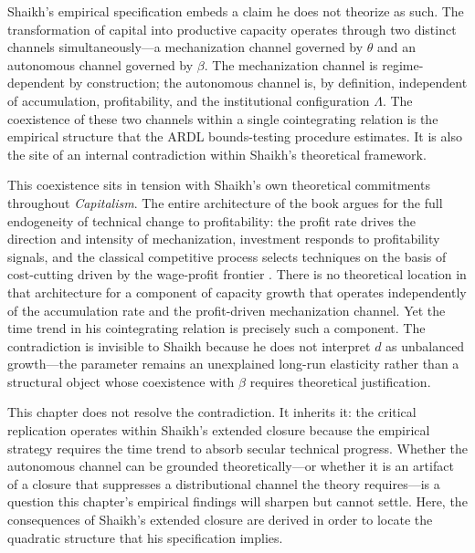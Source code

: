 Shaikh's empirical specification embeds a claim he does not theorize as such. The transformation of capital into productive capacity operates through two distinct channels simultaneously---a mechanization channel governed by $\theta$ and an autonomous channel governed by $\beta$. The mechanization channel is regime-dependent by construction; the autonomous channel is, by definition, independent of accumulation, profitability, and the institutional configuration $\Lambda$. The coexistence of these two channels within a single cointegrating relation is the empirical structure that the ARDL bounds-testing procedure estimates. It is also the site of an internal contradiction within Shaikh's theoretical framework.

This coexistence sits in tension with Shaikh's own theoretical commitments throughout \emph{Capitalism}. The entire architecture of the book argues for the full endogeneity of technical change to profitability: the profit rate drives the direction and intensity of mechanization, investment responds to profitability signals, and the classical competitive process selects techniques on the basis of cost-cutting driven by the wage-profit frontier \citep{Shaikh2016}. There is no theoretical location in that architecture for a component of capacity growth that operates independently of the accumulation rate and the profit-driven mechanization channel. Yet the time trend in his cointegrating relation is precisely such a component. The contradiction is invisible to Shaikh because he does not interpret $d$ as unbalanced growth---the parameter remains an unexplained long-run elasticity rather than a structural object whose coexistence with $\beta$ requires theoretical justification.

This chapter does not resolve the contradiction. It inherits it: the critical replication operates within Shaikh's extended closure because the empirical strategy requires the time trend to absorb secular technical progress. Whether the autonomous channel can be grounded theoretically---or whether it is an artifact of a closure that suppresses a distributional channel the theory requires---is a question this chapter's empirical findings will sharpen but cannot settle. Here, the consequences of Shaikh's extended closure are derived in order to locate the quadratic structure that his specification implies.

